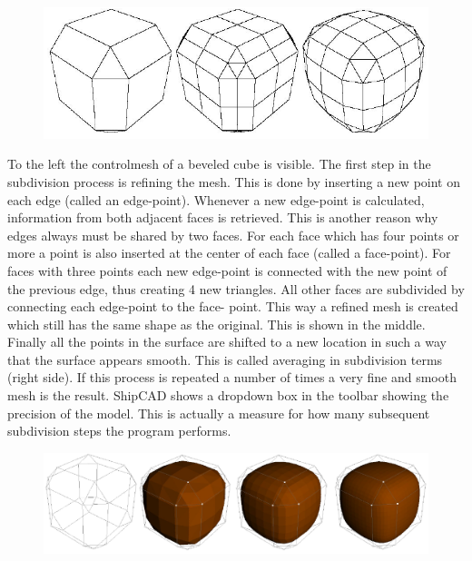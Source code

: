 \documentclass[12pt]{article}
\begin{document}
\begin{figure}[h]
        \centering
        \includegraphics[width=15cm,natwidth=697,natheight=238]{figure4.png}
        \caption{}
        \label{fig:mesh3}
\end{figure}

To the left the controlmesh of a beveled cube is visible. The first
step in the subdivision process is refining the mesh. This is done by
inserting a new point on each edge (called an edge-point).  Whenever a
new edge-point is calculated, information from both adjacent faces is
retrieved. This is another reason why edges always must be shared by
two faces. For each face which has four points or more a point is also
inserted at the center of each face (called a face-point). For faces
with three points each new edge-point is connected with the new point
of the previous edge, thus creating 4 new triangles. All other faces
are subdivided by connecting each edge-point to the face- point. This
way a refined mesh is created which still has the same shape as the
original. This is shown in the middle. Finally all the points in the
surface are shifted to a new location in such a way that the surface
appears smooth. This is called averaging in subdivision terms (right
side). If this process is repeated a number of times a very fine and
smooth mesh is the result. ShipCAD shows a dropdown box in the toolbar
showing the precision of the model. This is actually a measure for how
many subsequent subdivision steps the program performs.

\begin{figure}[h]
        \centering
        \includegraphics[width=12cm,natwidth=1065,natheight=280]{figure5.png}
        \caption{}
        \label{fig:mesh4}
\end{figure}
\end{document}
